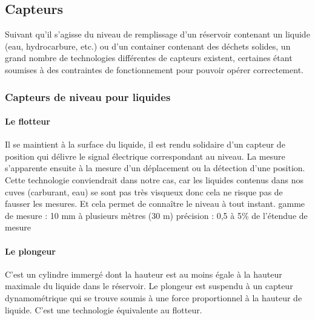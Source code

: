 

 

\subsection{Capteurs}

Suivant qu’il s’agisse du niveau de remplissage d’un réservoir contenant un liquide (eau, hydrocarbure, etc.) ou d’un container contenant des déchets solides, un grand nombre de technologies différentes de capteurs existent, certaines étant soumises à des contraintes de fonctionnement pour pouvoir opérer correctement.

\subsubsection{Capteurs de niveau pour liquides}

\paragraph{Le flotteur}

Il se maintient à la surface du liquide, il est rendu solidaire d'un capteur de position qui délivre le signal électrique correspondant au niveau. La mesure s'apparente ensuite à la mesure d'un déplacement ou la détection d'une position.
Cette technologie conviendrait dans notre cas, car les liquides contenus dans nos cuves (carburant, eau) se sont pas très visqueux donc cela ne risque pas de fausser les mesures. Et cela permet de connaître le niveau à tout instant.
gamme de mesure : 10 mm à plusieurs mètres (30 m)
précision : 0,5 à 5\% de l'étendue de mesure

\paragraph{Le plongeur}

C'est un cylindre immergé dont la hauteur est au moins égale à la hauteur maximale du liquide dans le réservoir. Le plongeur est suspendu à un capteur dynamométrique qui se trouve soumis à une force proportionnel à la hauteur de liquide. C’est une technologie équivalente au flotteur.

